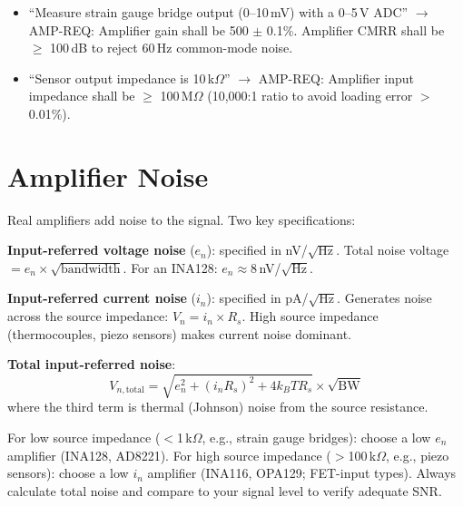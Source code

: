 \documentclass[11pt,letterpaper,twoside,openany]{book}
\begin{document}
\begin{keyconceptbox}
\begin{itemize}[nosep,leftmargin=1.5em]
\item ``Measure strain gauge bridge output (0--10\,mV) with a 0--5\,V ADC'' $\to$ AMP-REQ: Amplifier gain shall be 500 $\pm$ 0.1\%. Amplifier CMRR shall be $\geq$ 100\,dB to reject 60\,Hz common-mode noise.
\item ``Sensor output impedance is 10\,k$\Omega$'' $\to$ AMP-REQ: Amplifier input impedance shall be $\geq$ 100\,M$\Omega$ (10,000:1 ratio to avoid loading error $>$ 0.01\%).
\end{itemize}
\end{keyconceptbox}


\section{Amplifier Noise}
Real amplifiers add noise to the signal. Two key specifications:

\textbf{Input-referred voltage noise} ($e_n$): specified in nV/$\sqrt{\text{Hz}}$. Total noise voltage $= e_n \times \sqrt{\text{bandwidth}}$. For an INA128: $e_n \approx 8$\,nV/$\sqrt{\text{Hz}}$.

\textbf{Input-referred current noise} ($i_n$): specified in pA/$\sqrt{\text{Hz}}$. Generates noise across the source impedance: $V_n = i_n \times R_s$. High source impedance (thermocouples, piezo sensors) makes current noise dominant.

\textbf{Total input-referred noise}:
\begin{equation}
V_{n,\text{total}} = \sqrt{e_n^2 + (i_n R_s)^2 + 4k_B T R_s} \times \sqrt{\text{BW}}
\end{equation}
where the third term is thermal (Johnson) noise from the source resistance.

\begin{tipbox}
For low source impedance ($<$1\,k$\Omega$, e.g., strain gauge bridges): choose a low $e_n$ amplifier (INA128, AD8221). For high source impedance ($>$100\,k$\Omega$, e.g., piezo sensors): choose a low $i_n$ amplifier (INA116, OPA129; FET-input types). Always calculate total noise and compare to your signal level to verify adequate SNR.
\end{tipbox}
\end{document}
